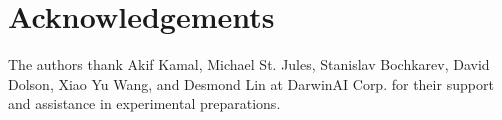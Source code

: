 \documentclass{article}
\begin{document}
\section*{Acknowledgements}
\vspace{-0.15in}
The authors thank Akif Kamal, Michael St. Jules, Stanislav Bochkarev, David Dolson, Xiao Yu Wang, and Desmond Lin at DarwinAI Corp. for their support and assistance in experimental preparations.
\vspace{-0.1in}{\footnotesize

\vspace{-0.1in}

}

\end{document}
